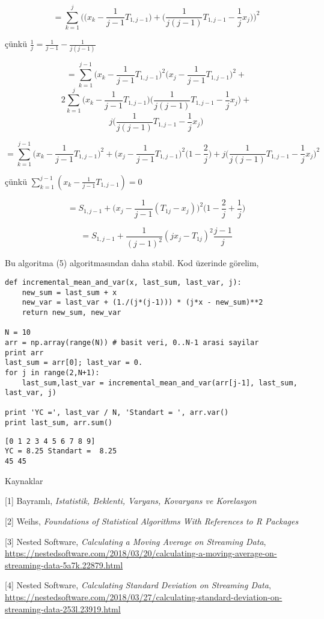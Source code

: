 \documentclass[12pt,fleqn]{article}\usepackage{../../common}
\begin{document}
$$ = \sum _{k=1}^{j} \bigg(
\bigg(x_k - \frac{1}{j-1}T_{1,j-1} \bigg) + 
\bigg( \frac{1}{j(j-1)} T_{1,j-1} - \frac{1}{j} x_j\bigg) 
\bigg)^2
$$

çünkü $\frac{1}{j} = \frac{1}{j-1}-\frac{1}{j(j-1)}$


$$
= \sum _{k=1}^{j-1} \bigg( x_k - \frac{1}{j-1} T_{1,j-1} \bigg)^2  
 \bigg( x_j - \frac{1}{j-1} T_{1,j-1} \bigg)^2 +
$$
$$
2 \sum _{k=1}^{j}  \bigg( x_k - \frac{1}{j-1} T_{1,j-1} \bigg)
\bigg( \frac{1}{j(j-1)} T_{1,j-1} - \frac{1}{j} x_j \bigg) +
$$
$$
j \bigg( \frac{1}{j(j-1)} T_{1,j-1} - \frac{1}{j} x_j \bigg) 
$$

$$ 
= \sum _{k=1}^{j-1} \bigg( x_k - \frac{1}{j-1} T_{1,j-1} \bigg)^2 + 
\bigg( x_j - \frac{1}{j-1} T_{1,j-1} \bigg)^2 \bigg( 1-\frac{2}{j} \bigg) + 
j \bigg( \frac{1}{j(j-1)} T_{1,j-1} - \frac{1}{j}x_j \bigg)^2
$$

çünkü $\sum _{k=1}^{j-1} (x_k-\frac{1}{j-1} T_{1,j-1} )=0$

$$ 
= S_{1,j-1}  + \bigg( x_j - \frac{1}{j-1} (T_{1j}-x_j) \bigg) ^2
\bigg( 1-\frac{2}{j}+\frac{1}{j}\bigg)
$$

$$ = S_{1,j-1} + \frac{1}{(j-1)^2} (jx_j - T_{1j})^2 \frac{j-1}{j} $$

Bu algoritma (5) algoritmasından daha stabil. Kod üzerinde görelim,

\begin{verbatim}
def incremental_mean_and_var(x, last_sum, last_var, j):
    new_sum = last_sum + x
    new_var = last_var + (1./(j*(j-1))) * (j*x - new_sum)**2 
    return new_sum, new_var

N = 10
arr = np.array(range(N)) # basit veri, 0..N-1 arasi sayilar
print arr
last_sum = arr[0]; last_var = 0.
for j in range(2,N+1):
    last_sum,last_var = incremental_mean_and_var(arr[j-1], last_sum, last_var, j)

print 'YC =', last_var / N, 'Standart = ', arr.var()
print last_sum, arr.sum()
\end{verbatim}

\begin{verbatim}
[0 1 2 3 4 5 6 7 8 9]
YC = 8.25 Standart =  8.25
45 45
\end{verbatim}


Kaynaklar

[1] Bayramlı, {\em Istatistik, Beklenti, Varyans, Kovaryans ve Korelasyon}

[2] Weihs, {\em Foundations of Statistical Algorithms With References to R Packages}

[3] Nested Software, {\em Calculating a Moving Average on Streaming Data},
    \url{https://nestedsoftware.com/2018/03/20/calculating-a-moving-average-on-streaming-data-5a7k.22879.html}

[4] Nested Software, {\em Calculating Standard Deviation on Streaming Data},
    \url{https://nestedsoftware.com/2018/03/27/calculating-standard-deviation-on-streaming-data-253l.23919.html}
\end{document}
